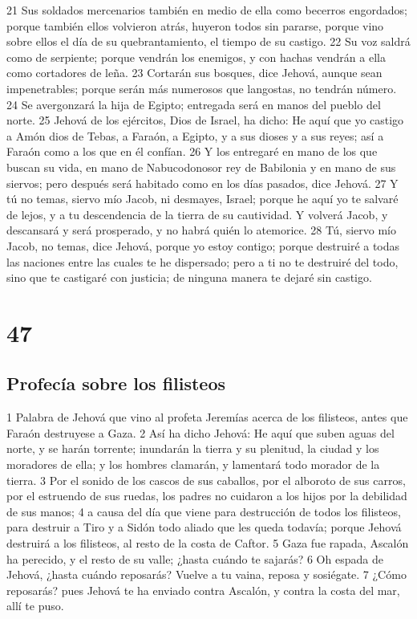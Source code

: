 21 Sus soldados mercenarios también en medio de ella como becerros engordados; porque también ellos volvieron atrás, huyeron todos sin pararse, porque vino sobre ellos el día de su quebrantamiento, el tiempo de su castigo.
22 Su voz saldrá como de serpiente; porque vendrán los enemigos, y con hachas vendrán a ella como cortadores de leña.
23 Cortarán sus bosques, dice Jehová, aunque sean impenetrables; porque serán más numerosos que langostas, no tendrán número.
24 Se avergonzará la hija de Egipto; entregada será en manos del pueblo del norte.
25 Jehová de los ejércitos, Dios de Israel, ha dicho: He aquí que yo castigo a Amón dios de Tebas, a Faraón, a Egipto, y a sus dioses y a sus reyes; así a Faraón como a los que en él confían.
26 Y los entregaré en mano de los que buscan su vida, en mano de Nabucodonosor rey de Babilonia y en mano de sus siervos; pero después será habitado como en los días pasados, dice Jehová. 
27 Y tú no temas, siervo mío Jacob, ni desmayes, Israel; porque he aquí yo te salvaré de lejos, y a tu descendencia de la tierra de su cautividad. Y volverá Jacob, y descansará y será prosperado, y no habrá quién lo atemorice.
28 Tú, siervo mío Jacob, no temas, dice Jehová, porque yo estoy contigo; porque destruiré a todas las naciones entre las cuales te he dispersado; pero a ti no te destruiré del todo, sino que te castigaré con justicia; de ninguna manera te dejaré sin castigo. 

\chapter{47}

\section*{Profecía sobre los filisteos}

1 Palabra de Jehová que vino al profeta Jeremías acerca de los filisteos, antes que Faraón destruyese a Gaza.
2 Así ha dicho Jehová: He aquí que suben aguas del norte, y se harán torrente; inundarán la tierra y su plenitud, la ciudad y los moradores de ella; y los hombres clamarán, y lamentará todo morador de la tierra.
3 Por el sonido de los cascos de sus caballos, por el alboroto de sus carros, por el estruendo de sus ruedas, los padres no cuidaron a los hijos por la debilidad de sus manos;
4 a causa del día que viene para destrucción de todos los filisteos, para destruir a Tiro y a Sidón todo aliado que les queda todavía; porque Jehová destruirá a los filisteos, al resto de la costa de Caftor.
5 Gaza fue rapada, Ascalón ha perecido, y el resto de su valle; ¿hasta cuándo te sajarás?
6 Oh espada de Jehová, ¿hasta cuándo reposarás? Vuelve a tu vaina, reposa y sosiégate.
7 ¿Cómo reposarás? pues Jehová te ha enviado contra Ascalón, y contra la costa del mar, allí te puso.

